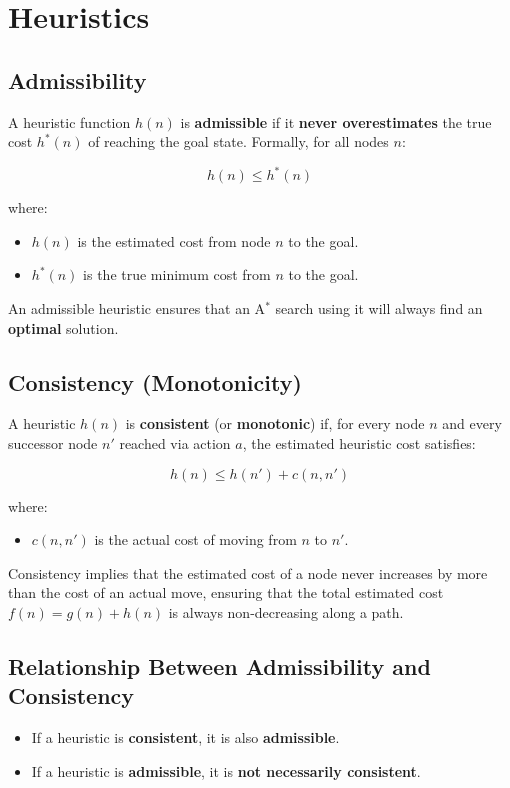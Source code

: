 \documentclass{article}
\begin{document}
\section{Heuristics}
\subsection*{Admissibility}
A heuristic function \( h(n) \) is \textbf{admissible} if it \textbf{never overestimates} the true cost \( h^*(n) \) of reaching the goal state. Formally, for all nodes \( n \):

\[
h(n) \leq h^*(n)
\]

where:
\begin{itemize}
    \item \( h(n) \) is the estimated cost from node \( n \) to the goal.
    \item \( h^*(n) \) is the true minimum cost from \( n \) to the goal.
\end{itemize}

An admissible heuristic ensures that an A\(^*\) search using it will always find an \textbf{optimal} solution.

\subsection*{Consistency (Monotonicity)}
A heuristic \( h(n) \) is \textbf{consistent} (or \textbf{monotonic}) if, for every node \( n \) and every successor node \( n' \) reached via action \( a \), the estimated heuristic cost satisfies:

\[
h(n) \leq h(n') + c(n, n')
\]

where:
\begin{itemize}
    \item \( c(n, n') \) is the actual cost of moving from \( n \) to \( n' \).
\end{itemize}

Consistency implies that the estimated cost of a node never increases by more than the cost of an actual move, ensuring that the total estimated cost \( f(n) = g(n) + h(n) \) is always non-decreasing along a path.

\subsection*{Relationship Between Admissibility and Consistency}
\begin{itemize}
    \item If a heuristic is \textbf{consistent}, it is also \textbf{admissible}.
    \item If a heuristic is \textbf{admissible}, it is \textbf{not necessarily consistent}.
\end{itemize}
\end{document}
